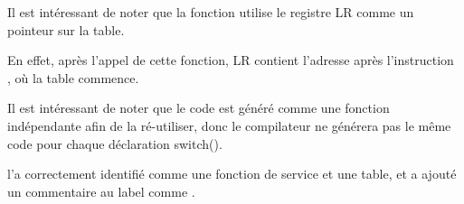 
Il est intéressant de noter que la fonction utilise le registre \ac{LR} comme un
pointeur sur la table.

En effet, après l'appel de cette fonction, \ac{LR} contient l'adresse après l'instruction\\
, où la table commence.

Il est intéressant de noter que le code est généré comme une fonction indépendante
afin de la ré-utiliser, donc le compilateur ne générera pas le même code pour chaque
déclaration switch().

\IDA l'a correctement identifié comme une fonction de service et une table, et a
ajouté un commentaire au label comme .


